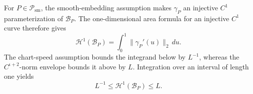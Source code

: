 For \(P\in\mathcal P_{\mathrm{sm}}\), the smooth-embedding assumption makes \(\gamma_P\) an injective \(C^1\) parameterization of \(\mathcal B_P\).  The one-dimensional area formula for an injective \(C^1\) curve therefore gives
\[
 \mathcal H^1(\mathcal B_P)=\int_0^1\|\gamma_P'(u)\|_2\,du.
\]
The chart-speed assumption bounds the integrand below by \(L^{-1}\), whereas the \(C^{\iota+2}\)-norm envelope bounds it above by \(L\).  Integration over an interval of length one yields
\[
 L^{-1}\leq\mathcal H^1(\mathcal B_P)\leq L.
\]